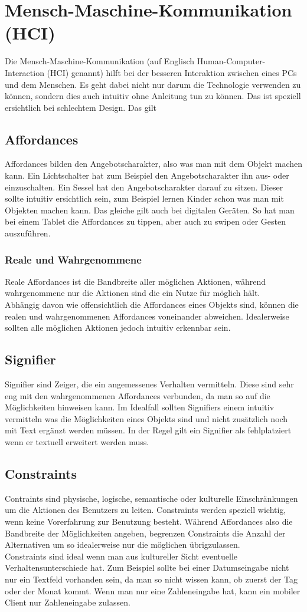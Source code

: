 \documentclass{article}
\begin{document}
	\section{Mensch-Maschine-Kommunikation (HCI)}
	Die Mensch-Maschine-Kommunikation (auf Englisch Human-Computer-Interaction (HCI) genannt) hilft bei der besseren Interaktion zwischen eines PCs und dem Menschen. Es geht dabei nicht nur darum die Technologie verwenden zu können, sondern dies auch intuitiv ohne Anleitung tun zu können. Das ist speziell ersichtlich bei schlechtem Design. Das gilt 
	\subsection{Affordances}
	Affordances bilden den Angebotscharakter, also was man mit dem Objekt machen kann. Ein Lichtschalter hat zum Beispiel den Angebotscharakter ihn aus- oder einzuschalten. Ein Sessel hat den Angebotscharakter darauf zu sitzen. Dieser sollte intuitiv ersichtlich sein, zum Beispiel lernen Kinder schon was man mit Objekten machen kann. Das gleiche gilt auch bei digitalen Geräten. So hat man bei einem Tablet die Affordances zu tippen, aber auch zu swipen oder Gesten auszuführen.
	\subsubsection{Reale und Wahrgenommene}
	Reale Affordances ist die Bandbreite aller möglichen Aktionen, während wahrgenommene nur die Aktionen sind die ein Nutze für möglich hält. \\
	Abhängig davon wie offensichtlich die Affordances eines Objekts sind, können die realen und wahrgenommenen Affordances voneinander abweichen. Idealerweise sollten alle möglichen Aktionen jedoch intuitiv erkennbar sein.
	\subsection{Signifier}
	Signifier sind Zeiger, die ein angemessenes Verhalten vermitteln. Diese sind sehr eng mit den wahrgenommenen Affordances verbunden, da man so auf die Möglichkeiten hinweisen kann. Im Idealfall sollten Signifiers einem intuitiv vermitteln was die Möglichkeiten eines Objekts sind und nicht zusätzlich noch mit Text ergänzt werden müssen. In der Regel gilt ein Signifier als fehlplatziert wenn er textuell erweitert werden muss.
	\subsection{Constraints}
	Contraints sind physische, logische, semantische oder kulturelle Einschränkungen um die Aktionen des Benutzers zu leiten. Constraints werden speziell wichtig, wenn keine Vorerfahrung zur Benutzung besteht. Während Affordances also die Bandbreite der Möglichkeiten angeben, begrenzen Constraints die Anzahl der Alternativen um so idealerweise nur die möglichen übrigzulassen. \\
	Constraints sind ideal wenn man aus kultureller Sicht eventuelle Verhaltensunterschiede hat. Zum Beispiel sollte bei einer Datumseingabe nicht nur ein Textfeld vorhanden sein, da man so nicht wissen kann, ob zuerst der Tag oder der Monat kommt. Wenn man nur eine Zahleneingabe hat, kann ein mobiler Client nur Zahleneingabe zulassen.
\end{document}
